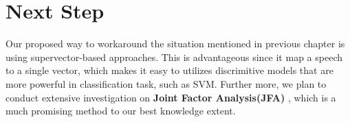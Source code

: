 \section{Next Step}

Our proposed way to workaround the situation mentioned in previous chapter is using
supervector-based approaches. This is advantageous since it map a speech to a single
vector, which makes it easy to utilizes discrimitive models that are more powerful
in classification task, such as SVM. Further more,
we plan to conduct extensive investigation on \textbf{Joint Factor Analysis(JFA)}
, which is a much promising method to our best knowledge extent.

